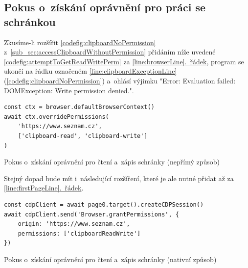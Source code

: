 \documentclass[12pt, a4paper, twoside]{article}
\newcommand{\codefigureSpacing}{1.2}
\newcommand{\refAddedText}[3]{\hyperref[#1]{#2\ref{#1}#3}}
\newcommand{\lineref}[2]{\refAddedText{#1}{}{.~#2}}
\begin{document}
	\subsection{Pokus o~získání oprávnění pro práci se schránkou}
	\label{sub_sec:permissionsProblems}
	Zkusíme-li rozšířit \cref{codefig:clipboardNoPermission} z~\ref{sub_sec:accessClipboardWithoutPermission} přidáním níže uvedené \cref{codefig:attemptToGetReadWritePerm} za \lineref{line:browserLine}{řádek}, program se ukončí na řádku označeném \ref{line:clipboardExceptionLine} (\cref{codefig:clipboardNoPermission}) a~ohlásí výjimku "Error: Evaluation failed: DOMException: Write permission denied.".
	\begin{codefigure}[H]
		\renewcommand\baselinestretch{\codefigureSpacing}
		\begin{lstlisting}[style=MyJavaScript]
const ctx = browser.defaultBrowserContext()
await ctx.overridePermissions(
	'https://www.seznam.cz', 
	['clipboard-read', 'clipboard-write']
)
		\end{lstlisting}
	\captionsetup{justification=centering}
	\caption{Pokus o~získání oprávnění pro čtení a~zápis schránky (nepřímý způsob)}
	\label{codefig:attemptToGetReadWritePerm}
	\end{codefigure}
	\noindent Stejný dopad bude mít i~následující rozšíření, které je ale nutné přidat až za \lineref{line:firstPageLine}{řádek}.
	\begin{codefigure}[H]
		\renewcommand\baselinestretch{\codefigureSpacing}
		\begin{lstlisting}[style=MyJavaScript]
const cdpClient = await page0.target().createCDPSession()
await cdpClient.send('Browser.grantPermissions', {
	origin: 'https://www.seznam.cz',
	permissions: ['clipboardReadWrite']
})
		\end{lstlisting}
	\captionsetup{justification=centering}
		\caption{Pokus o~získání oprávnění pro čtení a~zápis schránky (nativní způsob)}
	\end{codefigure}
\end{document}

